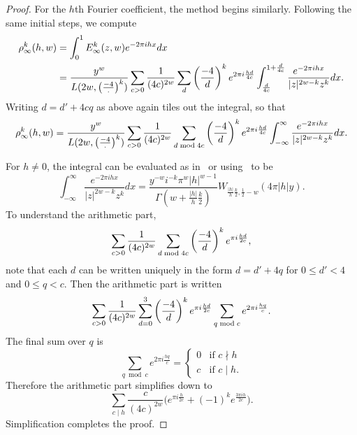 \begin{proof}
  For the $h$th Fourier coefficient, the method begins similarly.
  Following the same initial steps, we compute
  \begin{align}
    \rho_\infty^k(h,w) &= \int_0^1 E_\infty^k(z,w) e^{-2\pi i h x} dx \\
    &=
    \frac{y^w}{L(2w, \left(\frac{-4}{\cdot}\right)^k)} \sum_{c > 0} \frac{1}{(4c)^{2w}} \sum_d
    \left(\frac{-4}{d}\right)^k e^{2\pi i \frac{hd}{4c}} \int_{\frac{d}{4c}}^{1 + \frac{d}{4c}}
    \frac{e^{-2\pi i h x}}{\lvert z \rvert^{2w - k} z^k} dx.
  \end{align}
  Writing $d = d' + 4cq$ as above again tiles out the integral, so that
  \begin{equation}
    \rho_\infty^k(h,w) = \frac{y^w}{L(2w, \left(\frac{-4}{\cdot}\right)^k)} \sum_{c > 0}
    \frac{1}{(4c)^{2w}} \sum_{d\bmod 4c} \left(\frac{-4}{d}\right)^k e^{2\pi i \frac{hd}{4c}}
    \int_{-\infty}^{\infty} \frac{e^{-2\pi i h x}}{\lvert z \rvert^{2w - k} z^k} dx.
  \end{equation}

  For $h \neq 0$, the integral can be evaluated as in~\cite[\S13.7]{Iwaniec97} or
  using~\cite[3.385.9]{GradshteynRyzhik07} to be
  \begin{equation}\label{eq:IntegralIdentity_hth}
    \int_{-\infty}^{\infty} \frac{e^{-2\pi i h x}}{\lvert z \rvert^{2w - k} z^k} dx =
    \frac{y^{-w} i^{-k} \pi^w \lvert h \rvert^{w-1}}{\Gamma(w + \frac{\lvert h \rvert}{h}
    \frac{k}{2})} W_{\frac{\lvert h \rvert}{h}\frac{k}{2}, \frac{1}{2} - w}(4\pi \lvert h
  \rvert y).
  \end{equation}
  To understand the arithmetic part,
  \begin{equation}
    \sum_{c > 0} \frac{1}{(4c)^{2w}} \sum_{d \bmod 4c} \left(\frac{-4}{d}\right)^k e^{\pi i \frac{hd}{2c}},
  \end{equation}
  note that each $d$ can be written uniquely in the form $d = d' + 4q$ for $0 \leq d' < 4$
  and $0 \leq q < c$.
  Then the arithmetic part is written
  \begin{equation}
    \sum_{c > 0} \frac{1}{(4c)^{2w}} \sum_{d=0}^3 \left(\frac{-4}{d}\right)^k e^{\pi i
  \frac{hd}{2c}} \sum_{q \bmod c} e^{2\pi i \frac{hq}{c}}.  \end{equation}
  The final sum over $q$ is
  \begin{equation}
    \sum_{q \bmod c} e^{2\pi i \frac{hq}{c}} = \begin{cases}
      0 & \text{if } c \nmid h \\
      c & \text{if } c \mid h.
    \end{cases}
  \end{equation}
  Therefore the arithmetic part simplifies down to
  \begin{equation}
    \sum_{c \mid h} \frac{c}{(4c)^{2w}} \big( e^{\pi i \frac{h}{2c}} + (-1)^k
  e^{\frac{3\pi i h}{2c}} \big).  \end{equation}
  Simplification completes the proof.
\end{proof}

